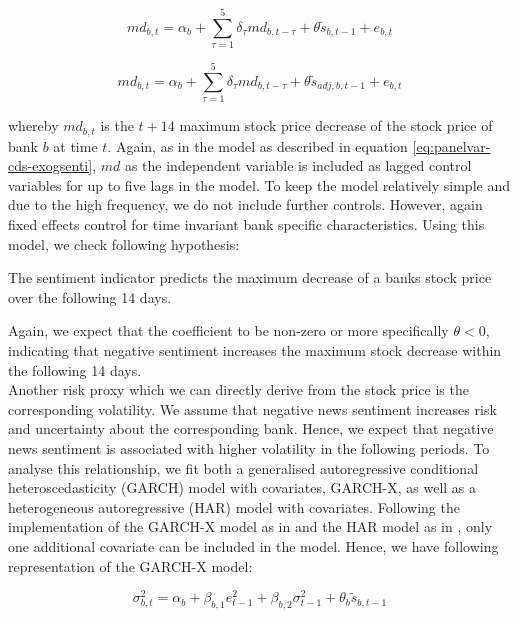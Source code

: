\begin{equation} \label{eq:mdd}
	md_{b,t} = \alpha_b + \sum_{\tau=1}^5\delta_\tau md_{b,t-\tau} + \theta \tilde{s}_{b,t-1} + e_{b,t}
\end{equation}

\begin{equation} \label{eq:mdd}
	md_{b,t} = \alpha_b + \sum_{\tau=1}^5\delta_\tau md_{b,t-\tau} + \theta \tilde{s}_{adj,b,t-1} + e_{b,t}
\end{equation}

whereby $md_{b,t}$ is the $t+14$ maximum stock price decrease of the stock price of bank $b$ at time $t$. Again, as in the model as described in equation \ref{eq:panelvar-cds-exogsenti}, $md$ as the independent variable is included as lagged control variables for up to five lags in the model. To keep the model relatively simple and due to the high frequency, we do not include further controls. However, again fixed effects control for time invariant bank specific characteristics. Using this model, we check following hypothesis:

\begin{hyp}
	The sentiment indicator predicts the maximum decrease of a banks stock price over the following 14 days.
\end{hyp}

Again, we expect that the coefficient to be non-zero or more specifically $\theta<0$, indicating that negative sentiment increases the maximum stock decrease within the following 14 days. \\

Another risk proxy which we can directly derive from the stock price is the corresponding volatility. We assume that negative news sentiment increases risk and uncertainty about the corresponding bank. Hence, we expect that negative news sentiment is associated with higher volatility in the following periods. To analyse this relationship, we fit both a generalised autoregressive conditional heteroscedasticity (GARCH) model with covariates, GARCH-X, as well as a heterogeneous autoregressive (HAR) model with covariates. Following the implementation of the GARCH-X model as in \cite{sucarrat2021} and the HAR model as in \cite{boudt2022}, only one additional covariate can be included in the model. Hence, we have following representation of the GARCH-X model: 

\begin{equation}
	\sigma^2_{b,t} = \alpha_b + \beta_{b,1}e^2_{t-1} + \beta_{b,2}\sigma^2_{t-1} + \theta_b\tilde{s}_{b,t-1}
\end{equation}

